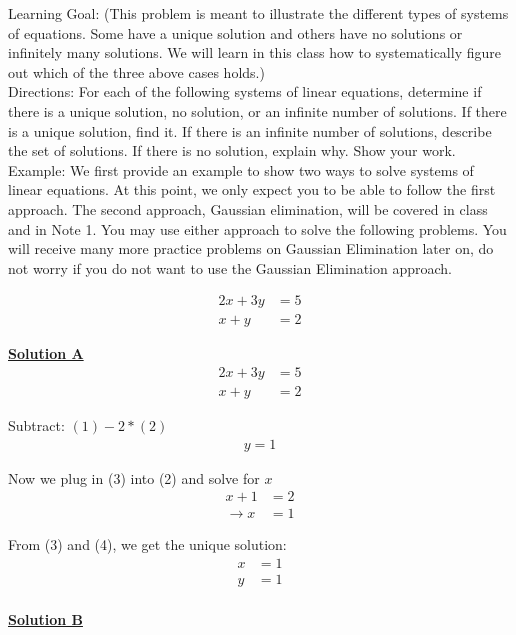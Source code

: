 \documentclass[11pt]{article}
\begin{document}
Learning Goal: (This problem is meant to illustrate the different types of systems of equations. Some have a unique solution and others have no solutions or infinitely many solutions. We will learn in this class how to systematically figure out which of the three above cases holds.) \\
Directions: For each of the following systems of linear equations, determine if there is a unique solution, no solution, or an infinite number of solutions. If there is a unique solution, find it. If there is an infinite number of solutions, describe the set of solutions. If there is no solution, explain why. Show your work. \\
Example: We first provide an example to show two ways to solve systems of linear equations. At this point, we only expect you to be able to follow the first approach. The second approach, Gaussian elimination, will be covered in class and in Note 1. You may use either approach to solve the following problems. You will receive many more practice problems on Gaussian Elimination later on, do not worry if you do not want to use the Gaussian Elimination approach.

\begin{align*}
    2x + 3y &= 5 \\
    x + y &= 2
\end{align*}

\textbf{\underline{Solution A}}
\begin{align}
    2x + 3y &= 5 \\
    x + y &= 2
\end{align}

Subtract: $(1)-2*(2)$
\begin{align}
    y = 1
\end{align}

Now we plug in (3) into (2) and solve for $x$
\begin{align}
    x + 1 &= 2 \nonumber \\ 
    \rightarrow x &= 1
\end{align}

From (3) and (4), we get the unique solution: 
\begin{align*}
    x &= 1 \\
    y &= 1
\end{align*}\\

\textbf{\underline{Solution B}}
\\
\end{document}

